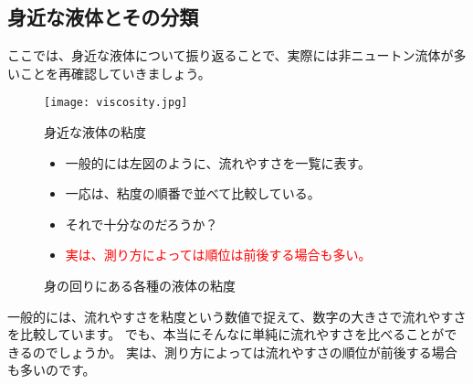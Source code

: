 \documentclass[uplatex,dvipdfmx,a4paper,11pt]{jsarticle}
\begin{document}
\subsection{身近な液体とその分類}
ここでは、身近な液体について振り返ることで、実際には非ニュートン流体が多いことを再確認していきましょう。
\begin{figure}[htb]
	\begin{center}
		\begin{minipage}{0.45\textwidth}
			\begin{center}
			\texttt{[image: viscosity.jpg]}
			\end{center}
		\end{minipage}
		\begin{minipage}{0.45\textwidth}
			\begin{itembox}[l]{身近な液体の粘度}
				\begin{itemize}
					\item 一般的には左図のように、流れやすさを一覧に表す。
					\item 一応は、粘度の順番で並べて比較している。
					\item それで十分なのだろうか？
					\item \textcolor{red}{実は、測り方によっては順位は前後する場合も多い。}
				\end{itemize}
			\end{itembox}
		\end{minipage}
		\caption{身の回りにある各種の液体の粘度}
	\end{center}
\end{figure}

一般的には、流れやすさを粘度という数値で捉えて、数字の大きさで流れやすさを比較しています。
でも、本当にそんなに単純に流れやすさを比べることができるのでしょうか。
実は、測り方によっては流れやすさの順位が前後する場合も多いのです。
\end{document}
